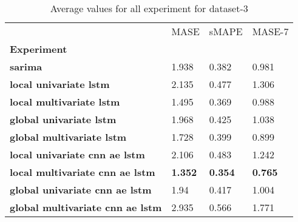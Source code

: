 \begin{table}[H]
\centering
\caption{Average values for all experiment for dataset-3}
\label{table:Average-metric-dataset-3}
\begin{tabular}{llll}
\toprule
{} &            MASE &           sMAPE &          MASE-7 \\
\textbf{Experiment                     } &                 &                 &                 \\
\midrule
\textbf{sarima                         } &           1.938 &           0.382 &           0.981 \\
\textbf{local univariate lstm          } &           2.135 &           0.477 &           1.306 \\
\textbf{local multivariate lstm        } &           1.495 &           0.369 &           0.988 \\
\textbf{global univariate lstm         } &           1.968 &           0.425 &           1.038 \\
\textbf{global multivariate lstm       } &           1.728 &           0.399 &           0.899 \\
\textbf{local univariate cnn ae lstm   } &           2.106 &           0.483 &           1.242 \\
\textbf{local multivariate cnn ae lstm } &  \textbf{1.352} &  \textbf{0.354} &  \textbf{0.765} \\
\textbf{global univariate cnn ae lstm  } &            1.94 &           0.417 &           1.004 \\
\textbf{global multivariate cnn ae lstm} &           2.935 &           0.566 &           1.771 \\
\bottomrule
\end{tabular}
\end{table}
